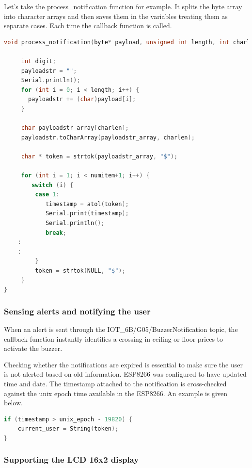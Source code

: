 \vspace{\baselineskip}
Let’s take the process\_notification function for example. It splits the byte array into character arrays and then saves them in the variables treating them as separate cases. Each time the callback function is called.\\

\begin{lstlisting}[language=C++]
void process_notification(byte* payload, unsigned int length, int charlen, int numitem) {

     int digit;
     payloadstr = "";
     Serial.println();
     for (int i = 0; i < length; i++) {
       payloadstr += (char)payload[i];
     }

     char payloadstr_array[charlen];
     payloadstr.toCharArray(payloadstr_array, charlen);

     char * token = strtok(payloadstr_array, "$");
   
     for (int i = 1; i < numitem+1; i++) {
        switch (i) {
         case 1:
            timestamp = atol(token);
            Serial.print(timestamp);
            Serial.println();
            break;
	:
	:
         }
         token = strtok(NULL, "$");
     }
}
\end{lstlisting}

\subsubsection{Sensing alerts and notifying the user}

When an alert is sent through the IOT\_6B/G05/BuzzerNotification topic, the callback function instantly identifies a crossing in ceiling or floor prices to activate the buzzer. 

Checking whether the notifications are expired is essential to make sure the user is not alerted based on old information. ESP8266 was configured to have updated time and date. The timestamp attached to the notification is cross-checked against the unix epoch time available in the ESP8266. An example is given below.\\

\begin{lstlisting}[language=C++]
if (timestamp > unix_epoch - 19820) {
    current_user = String(token);
}
\end{lstlisting}

\subsubsection{Supporting the LCD 16x2 display}

